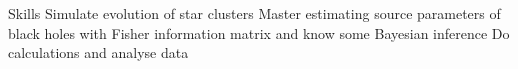 
\begin{rubric}{Skills}
    Simulate evolution of star clusters
    Master estimating source parameters of black holes with Fisher information matrix and know some Bayesian inference
    Do calculations and analyse data
\end{rubric}
